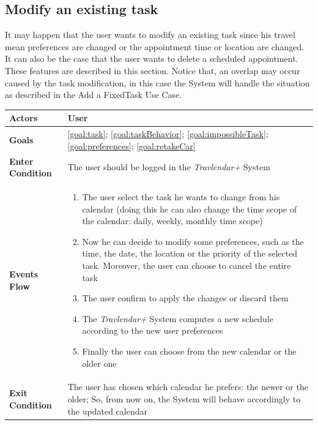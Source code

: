 \subsection{Modify an existing task}

It may happen that the user wants to modify an existing task since his travel mean preferences are changed or the appointment time or location are changed. It can also be the case that the user wants to delete a scheduled appointment. These features are described in this section. Notice that, an overlap may occur caused by the task modification, in this case the System will handle the situation as described in the Add a FixedTask Use Case.

\begin{table}[H]
	\centering
    
    \begin{tabular}{|p{3.5cm}|p{10.3cm}|}
    
    \hline
    \textbf{\large{Actors}}  			& \tabitem User\\
    
    \hline
    \textbf{\large{Goals}} 				& \ref{goal:task}; \ref{goal:taskBehavior}; \ref{goal:impossibleTask}; \ref{goal:preferences}; \ref{goal:retakeCar}\\
    
    \hline
    \textbf{\large{Enter Condition}}	& The user should be logged in the                                                        \emph{Travlendar+} System\\
    
    \hline
    \textbf{\large{Events Flow}}		& \begin{enumerate}[leftmargin=0.5cm]
                                             
                                          	\item The user select the task he wants to change from his calendar (doing this he can also change the time scope of the calendar: daily, weekly, monthly time scope)
                                          	\item Now he can decide to modify some preferences, such as the time, the date, the location or the priority of the selected task. Moreover, the user can choose to cancel the entire task
                                          	\item The user confirm to apply the changes or discard them
                                          	\item The \emph{Travlendar+} System computes a new schedule according to the new user preferences
                                          	\item Finally the user can choose from the new calendar or the older one
                                          \end{enumerate}
    										\\
    \hline
    \textbf{\large{Exit Condition}} 	& The user has chosen which calendar he prefers:                                          the newer or the older; So, from now on, the System will behave accordingly to the updated calendar\\
    

\end{tabular}
\end{table}
